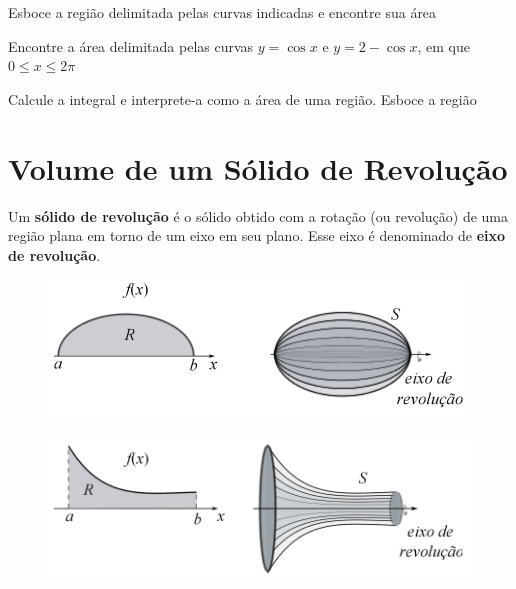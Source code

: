 \cleardoublepage\documentclass[../main.tex]{subfiles}
\begin{document}
\begin{exer}
Esboce a região delimitada pelas curvas indicadas e encontre sua área
\hfill
{}%
\end{exer}
\begin{exer}
Encontre a área delimitada pelas curvas  $y = \cos x$ e $ y = 2 - \cos x$, em que $  0\leq x\leq   2\pi$
\end{exer}
\begin{exer}
Calcule a integral e interprete-a como a área de uma região. Esboce a região\\
\hfill
{}
\end{exer}
\section{Volume de um Sólido de Revolução}
\begin{framed}
\begin{definition}
    Um \textbf{sólido de revolução} é o sólido obtido com a rotação (ou revolução) de uma região plana em torno de um eixo em seu plano. Esse eixo é denominado de \textbf{eixo de revolução}.
\end{definition}
\end{framed}
\begin{figure}[H]
    \centering
    \includegraphics{figs/Volume/SolidoRevEixox.png}
    \caption{}
\end{figure}
\begin{figure}[H]
    \centering
    \includegraphics{figs/Volume/SolidoRevEixox2.png}
    \caption{}
\end{figure}
\end{document}
